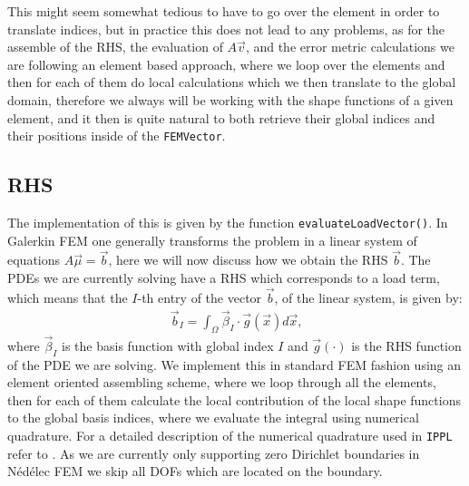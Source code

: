 This might seem somewhat tedious to have to go over the element in order to translate indices, but in practice this does not lead to any problems, as for the assemble of the RHS, the evaluation of $A\vec v$, and the error metric calculations we are following an element based approach, where we loop over the elements and then for each of them do local calculations which we then translate to the global domain, therefore we always will be working with the shape functions of a given element, and it then is quite natural to both retrieve their global indices and their positions inside of the \texttt{FEMVector}.

\subsection{RHS}
\label{subsubsec:rhs}
The implementation of this is given by the function \texttt{evaluateLoadVector()}. In Galerkin FEM one generally transforms the problem in a linear system of equations \(A \vec \mu = \vec b\), here we will now discuss how we obtain the RHS \(\vec b\). The PDEs we are currently solving have a RHS which corresponds to a load term, which means that the $I$-th entry of the vector $\vec{b}$, of the linear system, is given by:
\begin{align}
    \vec{b}_I = \int_\Omega \vec{\beta}_I \cdot \vec{g}(\vec{x}) d\vec{x} \text{,}
\end{align}
where $\vec{\beta}_I$ is the basis function with global index $I$ and \(\vec g(\cdot)\) is the RHS function of the PDE we are solving. We implement this in standard FEM fashion using an element oriented assembling scheme, where we loop through all the elements, then for each of them calculate the local contribution of the local shape functions to the global basis indices, where we evaluate the integral using numerical quadrature. For a detailed description of the numerical quadrature used in \texttt{IPPL} refer to \cite{femIppl}. As we are currently only supporting zero Dirichlet boundaries in Nédélec FEM we skip all DOFs which are located on the boundary.\medskip

